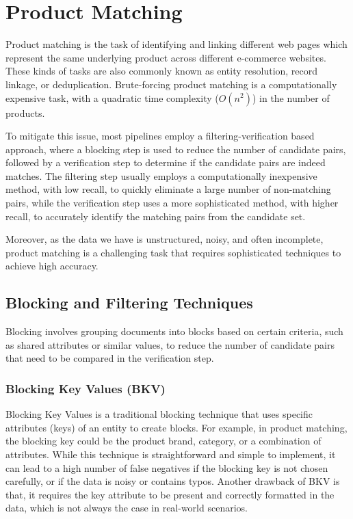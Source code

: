 \section{Product Matching}\label{sec:product_matching}

Product matching is the task of identifying and linking different web pages which represent the same underlying product across different e-commerce websites.
These kinds of tasks are also commonly known as entity resolution, record linkage, or deduplication.
Brute-forcing product matching is a computationally expensive task, with a quadratic time complexity ($O(n^2)$) in the number of products\cite{shao2018active}.

To mitigate this issue, most pipelines employ a filtering-verification based approach, where a blocking step is used to reduce the number of candidate pairs, followed by a verification step to determine if the candidate pairs are indeed matches.
The filtering step usually employs a computationally inexpensive method, with low recall, to quickly eliminate a large number of non-matching pairs, while the verification step uses a more sophisticated method, with higher recall, to accurately identify the matching pairs from the candidate set.

Moreover, as the data we have is unstructured, noisy, and often incomplete, product matching is a challenging task that requires sophisticated techniques to achieve high accuracy.

\subsection{Blocking and Filtering Techniques}\label{subsec:blocking_and_filtering}

Blocking involves grouping documents into blocks based on certain criteria, such as shared attributes or similar values, to reduce the number of candidate pairs that need to be compared in the verification step.

\subsubsection{Blocking Key Values (BKV)}\label{subsubsec:bkv}
Blocking Key Values is a traditional blocking technique that uses specific attributes (keys) of an entity to create blocks.
For example, in product matching, the blocking key could be the product brand, category, or a combination of attributes.
While this technique is straightforward and simple to implement, it can lead to a high number of false negatives if the blocking key is not chosen carefully, or if the data is noisy or contains typos.
Another drawback of BKV is that, it requires the key attribute to be present and correctly formatted in the data, which is not always the case in real-world scenarios.\cite{moslemi2024evaluating}

